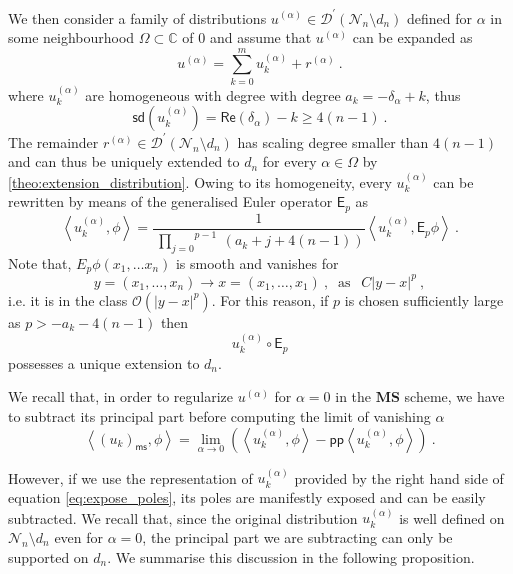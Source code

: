 \documentclass[12pt]{book}
\newcommand{\pp}{\mathsf{pp}}
\newcommand{\ms}{\mathsf{ms}}
\newcommand{\sd}{\mathsf{sd}}
\renewcommand{\Re}{\mathsf{Re}}
\newcommand{\MS}{\textbf{MS}}
\newcommand{\sm}[1]{\left\langle#1\right\rangle}
\newcommand{\Dcal}{\mathcal{D}}
\newcommand{\Ncal}{\mathcal{N}}
\newcommand{\Ocal}{\mathcal{O}}
\newcommand{\Cbb}{\mathbb{C}}
\newcommand{\Esf}{\mathsf{E}}
\theoremstyle{break}
\begin{document}
We then consider a family of distributions $u^{(\alpha)} \in \Dcal^\prime(\Ncal_n\setminus d_n)$ defined for $\alpha$ in some neighbourhood $\Omega \subset \Cbb$ of $0$ and assume that $u^{(\alpha)}$ can be expanded as
%
\begin{equation*}
u^{(\alpha)}  = \sum_{k=0}^m u^{(\alpha)}_k + r^{(\alpha)} \ . 
\end{equation*}
%
where $u^{(\alpha)}_k$ are homogeneous with degree with degree $a_k = - \delta_\alpha + k$, thus 
%
\begin{equation*}
\sd(u^{(\alpha)}_k) = \Re\left(\delta_\alpha\right) - k \geq 4(n-1) \ .
\end{equation*}
%
The remainder $r^{(\alpha)}\in \Dcal^\prime(\Ncal_n\setminus d_n)$ has scaling degree smaller than $4(n-1)$ and can thus be uniquely extended to $d_n$ for every $\alpha \in \Omega$ by \ref{theo:extension_distribution}. Owing to its homogeneity, every $u^{(\alpha)}_k$ can be rewritten by means of the generalised Euler operator $\Esf_p$ as
%
\begin{equation}
\sm{ u^{(\alpha)}_k, \phi } = \frac{1}{\overset{p-1}{\ \underset{j=0}{\prod}} \ (a_k+j+4(n-1))}   \sm{ u^{(\alpha)}_k, \Esf_p \phi } \ .
\label{eq:expose_poles}
\end{equation}
%
Note that, $E_p \phi(x_1, \dots x_n)$ is smooth and vanishes for
%
\begin{equation*}
y = (x_1 , \dots , x_n) \to x = (x_1, \dots , x_1) \ , \ \mbox{ as } \ \ C|y-x|^p \ , 
\end{equation*}
%
i.e. it is in the class $\Ocal(|y-x|^{p})$. For this reason, if  $p$ is chosen sufficiently large as $p > -a_k-4(n-1)$ then 
\begin{equation*}
u^{(\alpha)}_k \circ \Esf_p 
\end{equation*}
%
possesses a unique extension to $d_n$. 



We recall that, in order to regularize $u^{(\alpha)}$ for $\alpha=0$ in the $\MS$ scheme, we have to subtract its principal part before computing the limit of vanishing $\alpha$
%
\begin{equation*}
\sm{ (u_k)_\ms, \phi } = \lim_{\alpha \to 0} \left( \sm{ u^{(\alpha)}_k, \phi } - \pp\sm{ u^{(\alpha)}_k , \phi } \right) \ .
\end{equation*}


However, if we use the representation of $u^{(\alpha)}_k$ provided by the right hand side of equation \eqref{eq:expose_poles}, its poles are manifestly exposed and can be easily subtracted. We recall that, since the original distribution $u^{(\alpha)}_k$ is well defined on $\Ncal_n\setminus d_n$ even for $\alpha=0$, the principal part we are subtracting can only be supported on $d_n$. We summarise this discussion in the following proposition.
\end{document}
